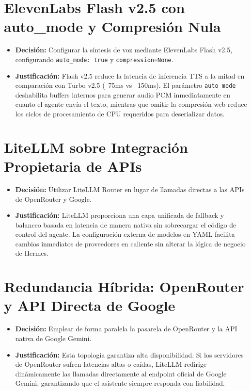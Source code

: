 \documentclass[12pt,a4paper,openany]{book}
\newcommand{\code}[1]{\texttt{\small#1}}
\begin{document}
\section{ElevenLabs Flash v2.5 con auto\_mode y Compresión Nula}
\begin{itemize}
    \item \textbf{Decisión:} Configurar la síntesis de voz mediante ElevenLabs Flash v2.5, configurando \code{auto\_mode: true} y \code{compression=None}.
    \item \textbf{Justificación:} Flash v2.5 reduce la latencia de inferencia TTS a la mitad en comparación con Turbo v2.5 (~75ms vs ~150ms). El parámetro \code{auto\_mode} deshabilita buffers internos para generar audio PCM inmediatamente en cuanto el agente envía el texto, mientras que omitir la compresión web reduce los ciclos de procesamiento de CPU requeridos para deserializar datos.
\end{itemize}

\section{LiteLLM sobre Integración Propietaria de APIs}
\begin{itemize}
    \item \textbf{Decisión:} Utilizar LiteLLM Router en lugar de llamadas directas a las APIs de OpenRouter y Google.
    \item \textbf{Justificación:} LiteLLM proporciona una capa unificada de fallback y balanceo basada en latencia de manera nativa sin sobrecargar el código de control del agente. La configuración externa de modelos en YAML facilita cambios inmediatos de proveedores en caliente sin alterar la lógica de negocio de Hermes.
\end{itemize}

\section{Redundancia Híbrida: OpenRouter y API Directa de Google}
\begin{itemize}
    \item \textbf{Decisión:} Emplear de forma paralela la pasarela de OpenRouter y la API nativa de Google Gemini.
    \item \textbf{Justificación:} Esta topología garantiza alta disponibilidad. Si los servidores de OpenRouter sufren latencias altas o caídas, LiteLLM redirige dinámicamente las llamadas directamente al endpoint oficial de Google Gemini, garantizando que el asistente siempre responda con fiabilidad.
\end{itemize}
\end{document}
